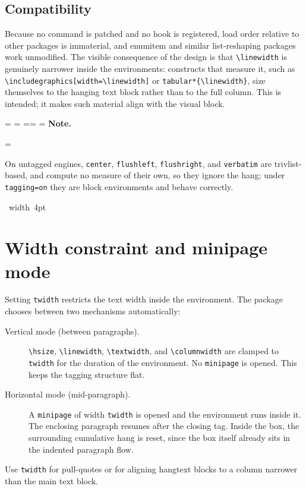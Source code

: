\documentclass[11pt, twoside, openany]{article}
\makeatletter
\newcommand{\pkg}[1]{\textsf{#1}}
\newcommand{\opt}[1]{\texttt{#1}}
\newcommand{\env}[1]{\texttt{#1}}
\newcommand{\cs}[1]{\texttt{\textbackslash #1}}
\newcommand*{\cns@tag@artifact@begin}{}
\newcommand*{\cns@tag@artifact@end}{}
\newenvironment{TodoNote}[1][]{%
  \par\addvspace{0.5\baselineskip plus 2pt}%
  \setbox\cns@box=\vbox\bgroup
    \hsize=\linewidth
    \advance\hsize -10pt
    \linewidth=\hsize \columnwidth=\hsize
    \parindent=\z@
    \noindent\textbf{\sffamily Note\cns@ifnotempty{#1}{ \textmd{(#1)}}.}%
    \par\nobreak
    \@afterindentfalse\@afterheading
    \leftskip=\cns@indent\relax
    \ignorespaces
}{%
  \par
  \egroup
  \vbox{\hbox{%
    \cns@tag@artifact@begin\vrule width 4pt\cns@tag@artifact@end
    \hskip 6pt\relax
    \box\cns@box
  }}%
  \par\addvspace{0.5\baselineskip plus 2pt}%
}
\makeatother
\begin{document}
\subsection*{Compatibility}

Because no command is patched and no hook is registered, load order relative to other packages is immaterial, and \pkg{enumitem} and similar list-reshaping packages work unmodified. The visible consequence of the design is that \cs{linewidth} is genuinely narrower inside the environments: constructs that measure it, such as \cs{includegraphics[width=\textbackslash linewidth]} or \env{tabular*}\texttt{\{}\cs{linewidth}\texttt{\}}, size themselves to the hanging text block rather than to the full column. This is intended; it makes such material align with the visual block.

\begin{TodoNote}
    On untagged engines, \env{center}, \env{flushleft}, \env{flushright}, and \env{verbatim} are trivlist-based, and compute no measure of their own, so they ignore the hang; under \opt{tagging=on} they are block environments and behave correctly.
\end{TodoNote}



\section{Width constraint and minipage mode}\label{sec:twidth}

Setting \opt{twidth} restricts the text width inside the environment. The package chooses between two mechanisms automatically:

\begin{description}
  \item[Vertical mode (between paragraphs).] \cs{hsize}, \cs{linewidth}, \cs{textwidth}, and \cs{columnwidth} are clamped to \opt{twidth} for the duration of the environment. No \env{minipage} is opened. This keeps the tagging structure flat.
  \item[Horizontal mode (mid-paragraph).] A \env{minipage} of width \opt{twidth} is opened and the environment runs inside it. The enclosing paragraph resumes after the closing tag. Inside the box, the surrounding cumulative hang is reset, since the box itself already sits in the indented paragraph flow.
\end{description}

Use \opt{twidth} for pull-quotes or for aligning \pkg{hangtext} blocks to a column narrower than the main text block.
\end{document}
